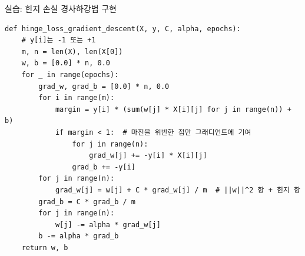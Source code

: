 \begin{frame}[fragile]{실습: 힌지 손실 경사하강법 구현}
  \begin{lstlisting}
def hinge_loss_gradient_descent(X, y, C, alpha, epochs):
    # y[i]는 -1 또는 +1
    m, n = len(X), len(X[0])
    w, b = [0.0] * n, 0.0
    for _ in range(epochs):
        grad_w, grad_b = [0.0] * n, 0.0
        for i in range(m):
            margin = y[i] * (sum(w[j] * X[i][j] for j in range(n)) + b)
            if margin < 1:  # 마진을 위반한 점만 그래디언트에 기여
                for j in range(n):
                    grad_w[j] += -y[i] * X[i][j]
                grad_b += -y[i]
        for j in range(n):
            grad_w[j] = w[j] + C * grad_w[j] / m  # ||w||^2 항 + 힌지 항
        grad_b = C * grad_b / m
        for j in range(n):
            w[j] -= alpha * grad_w[j]
        b -= alpha * grad_b
    return w, b
\end{lstlisting}
\end{frame}
